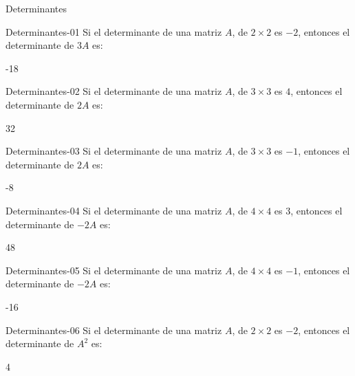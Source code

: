 \documentclass[a4,11pt]{aleph-notas}
\begin{document}
\begin{quiz}{Determinantes}

\begin{numerical}[tolerance=0.01]%
    {Determinantes-01}
    Si el determinante de una matriz $A$, de $2\times 2$ es $-2$, entonces el determinante de $3A$ es:
    \item -18
\end{numerical}

\begin{numerical}[tolerance=0.01]%
    {Determinantes-02}
    Si el determinante de una matriz $A$, de $3\times 3$ es $4$, entonces el determinante de $2A$ es:
    \item 32
\end{numerical}

\begin{numerical}[tolerance=0.01]%
    {Determinantes-03}
    Si el determinante de una matriz $A$, de $3\times 3$ es $-1$, entonces el determinante de $2A$ es:
    \item -8
\end{numerical}

\begin{numerical}[tolerance=0.01]%
    {Determinantes-04}
    Si el determinante de una matriz $A$, de $4\times 4$ es $3$, entonces el determinante de $-2A$ es:
    \item 48
\end{numerical}

\begin{numerical}[tolerance=0.01]%
    {Determinantes-05}
    Si el determinante de una matriz $A$, de $4\times 4$ es $-1$, entonces el determinante de $-2A$ es:
    \item -16
\end{numerical}

\begin{numerical}[tolerance=0.01]%
    {Determinantes-06}
    Si el determinante de una matriz $A$, de $2\times 2$ es $-2$, entonces el determinante de $A^2$ es:
    \item 4
\end{numerical}


\end{quiz}
\end{document}
